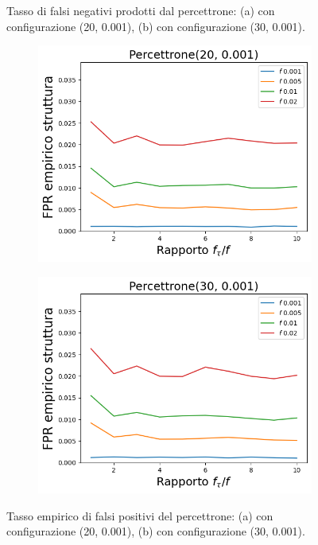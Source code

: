 \documentclass[../../main.tex]{subfiles}
\begin{document}
\begin{figure}[H]
\begin{subfigure}[b]{0.49\textwidth}
            \caption{}
            \label{fig:SLBFFNRPercettrone30}
        \end{subfigure}
        \caption{Tasso di falsi negativi prodotti dal percettrone: (a) con configurazione (20, 0.001), (b) con configurazione (30, 0.001).}
        \label{fig:SLBFFNRPercettrone}
    \end{figure}
    \begin{figure}[H]
        \begin{subfigure}[b]{0.49\textwidth}
            \centering
            \includegraphics[width = \textwidth]{immagini/7/SLBF/Percettrone(20, 0.001)_FPR.png}
            \caption{}
            \label{fig:SLBFFPRPercettrone20}
        \end{subfigure}
        \begin{subfigure}[b]{0.49\textwidth}
            \centering
            \includegraphics[width = \textwidth]{immagini/7/SLBF/Percettrone(30, 0.001)_FPR.png}
            \caption{}
            \label{fig:SLBFFPRPercettrone30}
        \end{subfigure}
        \caption{Tasso empirico di falsi positivi del percettrone: (a) con configurazione (20, 0.001), (b) con configurazione (30, 0.001).}
        \label{fig:SLBFFPRPercettrone}
    \end{figure}
\end{document}
